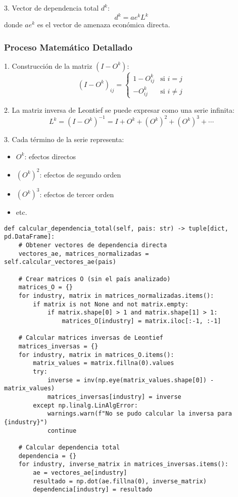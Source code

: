 \documentclass[11pt,a4paper]{article}
\begin{document}
3. Vector de dependencia total $d^k$:
\begin{equation}
d^k = ae^k L^k
\end{equation}
donde $ae^k$ es el vector de amenaza económica directa.

\subsubsection{Proceso Matemático Detallado}

1. Construcción de la matriz $(I - O^k)$:
\begin{equation}
(I - O^k)_{ij} = \begin{cases}
1 - O^k_{ij} & \text{si } i = j \\
-O^k_{ij} & \text{si } i \neq j
\end{cases}
\end{equation}

2. La matriz inversa de Leontief se puede expresar como una serie infinita:
\begin{equation}
L^k = (I - O^k)^{-1} = I + O^k + (O^k)^2 + (O^k)^3 + \cdots
\end{equation}

3. Cada término de la serie representa:
\begin{itemize}
    \item $O^k$: efectos directos
    \item $(O^k)^2$: efectos de segundo orden
    \item $(O^k)^3$: efectos de tercer orden
    \item etc.
\end{itemize}

\begin{tcolorbox}[colback=codebackground,title=Implementación del Método]
\begin{lstlisting}
def calcular_dependencia_total(self, pais: str) -> tuple[dict, pd.DataFrame]:
    # Obtener vectores de dependencia directa
    vectores_ae, matrices_normalizadas = self.calcular_vectores_ae(pais)
    
    # Crear matrices O (sin el país analizado)
    matrices_O = {}
    for industry, matrix in matrices_normalizadas.items():
        if matrix is not None and not matrix.empty:
            if matrix.shape[0] > 1 and matrix.shape[1] > 1:
                matrices_O[industry] = matrix.iloc[:-1, :-1]
    
    # Calcular matrices inversas de Leontief
    matrices_inversas = {}
    for industry, matrix in matrices_O.items():
        matrix_values = matrix.fillna(0).values
        try:
            inverse = inv(np.eye(matrix_values.shape[0]) - matrix_values)
            matrices_inversas[industry] = inverse
        except np.linalg.LinAlgError:
            warnings.warn(f"No se pudo calcular la inversa para {industry}")
            continue
    
    # Calcular dependencia total
    dependencia = {}
    for industry, inverse_matrix in matrices_inversas.items():
        ae = vectores_ae[industry]
        resultado = np.dot(ae.fillna(0), inverse_matrix)
        dependencia[industry] = resultado
\end{lstlisting}
\end{tcolorbox}
\end{document}
